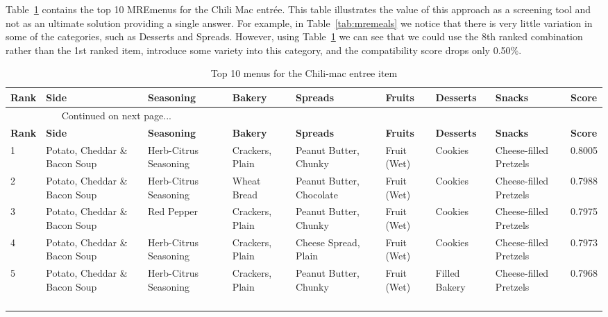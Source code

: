 Table~\ref{tab:mrechili} contains the top 10 MRE\tm menus for the Chili Mac entrée.  This table illustrates the value of this approach as a screening tool and not as an ultimate solution providing a single answer.  For example, in Table~\ref{tab:mremeals} we notice that there is very little variation in some of the categories, such as Desserts and Spreads.  However, using Table~\ref{tab:mrechili} we can see that we could use the 8th ranked combination rather than the 1st ranked item, introduce some variety into this category, and the compatibility score drops only 0.50\%.  

\begin{landscape}
\footnotesize
\begin{longtable}{p{0.5cm}p{4cm}p{4cm}p{2cm}p{2.3cm}p{0.8cm}p{1.5cm}p{2.2cm}p{0.8cm}}
\caption{Top 10 menus for the Chili-mac entree item } \\
\label{tab:mrechili}
\endfirsthead
\midrule
{\bf Rank} & {\bf Side} & {\bf Seasoning} & {\bf Bakery} & {\bf Spreads} & {\bf Fruits} & {\bf Desserts} & {\bf Snacks} & {\bf Score}\\
\hline
\endhead
\multicolumn{3}{c}{Continued on next page...} \\
\endfoot
\bottomrule
\endlastfoot
\toprule
{\bf Rank} & {\bf Side} & {\bf Seasoning} & {\bf Bakery} & {\bf Spreads} & {\bf Fruits} & {\bf Desserts} & {\bf Snacks} & {\bf Score}\\
\midrule
1 & Potato, Cheddar \& Bacon Soup & Herb-Citrus Seasoning & Crackers, Plain & Peanut Butter, Chunky & Fruit (Wet) & Cookies & Cheese-filled Pretzels & 0.8005\\
\midrule
2 & Potato, Cheddar \& Bacon Soup & Herb-Citrus Seasoning & Wheat Bread & Peanut Butter, Chocolate & Fruit (Wet) & Cookies & Cheese-filled Pretzels & 0.7988\\
\midrule
3 & Potato, Cheddar \& Bacon Soup & Red Pepper & Crackers, Plain & Peanut Butter, Chunky & Fruit (Wet) & Cookies & Cheese-filled Pretzels & 0.7975\\
\midrule
4 & Potato, Cheddar \& Bacon Soup & Herb-Citrus Seasoning & Crackers, Plain & Cheese Spread, Plain & Fruit (Wet) & Cookies & Cheese-filled Pretzels & 0.7973\\
\midrule
5 & Potato, Cheddar \& Bacon Soup & Herb-Citrus Seasoning & Crackers, Plain & Peanut Butter, Chunky & Fruit (Wet) & Filled Bakery & Cheese-filled Pretzels & 0.7968\\
\midrule
\\
\\
\\
\\


\end{longtable}
\end{landscape}
